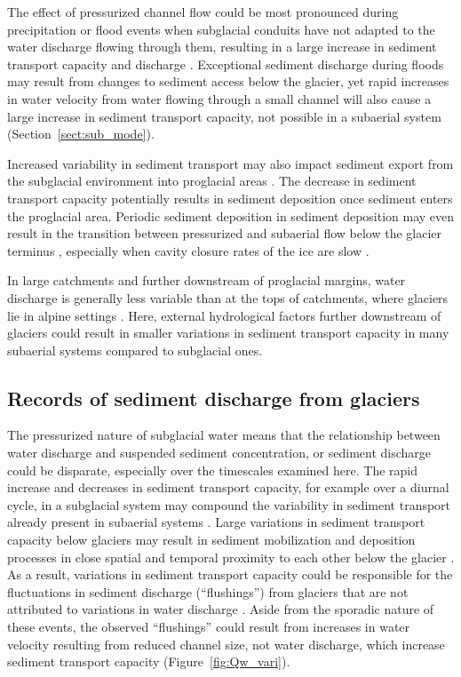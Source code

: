\documentclass[11pt]{article}
\begin{document}
The effect of pressurized channel flow could be most pronounced during precipitation or flood events when subglacial conduits have not adapted to the water discharge flowing through them, resulting in a large increase in sediment transport capacity and discharge \citep[e.g.][]{cowan1988,delaney2019}.
Exceptional sediment discharge during floods may result from changes to sediment access below the glacier, yet rapid increases in water velocity from water flowing through a small channel will also cause a large increase in sediment transport capacity, not possible in a subaerial system (Section~\ref{sect:sub_mode}).

Increased variability in sediment transport may also impact sediment export from the subglacial environment into proglacial areas \citep[e.g.][]{perolo2018}.
The decrease in sediment transport capacity potentially results in sediment deposition once sediment enters the proglacial area.
Periodic sediment deposition in sediment deposition may even result in the transition between pressurized and subaerial flow below the glacier terminus \citep{perolo2018}, especially when cavity closure rates of the ice are slow \citep{egli2021b}.

In large catchments and further downstream of proglacial margins, water discharge is generally less variable than at the tops of catchments, where glaciers lie in
alpine settings \citep[][]{swift2005,riihimaki2005,costa2017,vanas2017}.
Here, external hydrological factors further downstream of glaciers could result in smaller variations in sediment transport capacity in many subaerial systems compared to subglacial ones.


\subsection{Records of sediment discharge  from glaciers}

The pressurized nature of subglacial water means that the relationship between water discharge and suspended sediment concentration, or sediment discharge could be disparate, especially over the timescales examined here.
The rapid increase and decreases in sediment transport capacity, for example over a diurnal cycle, in a subglacial system may compound the variability in sediment transport already present in subaerial systems \citep[Figure~\ref{fig:Qw_vari}; ][]{williams1989,jerolmack2010}.
Large variations in sediment transport capacity below glaciers may result in sediment mobilization and deposition processes in close spatial and temporal proximity to each other below the glacier \citep{gimbert2016,perolo2018}.
As a result, variations in sediment transport capacity could be responsible for the fluctuations in sediment discharge (``flushings'') from glaciers that are not attributed to variations in water discharge \citep[e.g.][]{richards2003,swift2021}.
Aside from the sporadic nature of these events, the observed ``flushings'' could result from increases in water velocity resulting from reduced channel size, not water discharge, which increase sediment transport capacity (Figure~\ref{fig:Qw_vari}).
\end{document}
